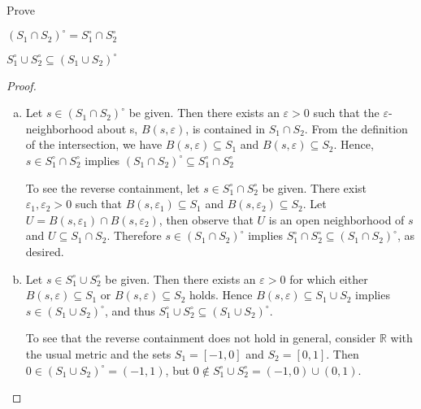 \documentclass[10pt]{amsart}
\begin{document}
\begin{ex13}{}
  Prove\\
  \begin{inparaenum}[(a)]
  \item\label{13a}
    $(S_1 \cap S_2)^\circ = S_1^\circ \cap S_2^\circ$\hspace{10mm}
  \item\label{13b}
    $S_1^\circ \cup S_2^\circ \subseteq (S_1 \cup S_2)^\circ$
  \end{inparaenum}
  
  \begin{proof}
    \begin{enumerate}[(a)]
    \item
      Let $s \in (S_1 \cap S_2)^\circ$ be given.
      Then there exists an $\varepsilon > 0$ such that the $\varepsilon$-neighborhood about s, $B(s,\varepsilon)$, is contained in $S_1 \cap S_2$.
      From the definition of the intersection, we have $B(s,\varepsilon) \subseteq S_1$ and $B(s,\varepsilon) \subseteq S_2$.
      Hence, $s \in S_1^\circ \cap S_2^\circ$ implies $(S_1 \cap S_2)^\circ \subseteq S_1^\circ \cap S_2^\circ$
      
      To see the reverse containment, let $s \in S_1^\circ \cap S_2^\circ$ be given.
      There exist $\varepsilon_1, \varepsilon_2 > 0$ such that $B(s,\varepsilon_1) \subseteq S_1$ and $B(s,\varepsilon_2) \subseteq S_2$.
      Let $U = B(s,\varepsilon_1) \cap B(s,\varepsilon_2)$, then observe that $U$ is an open neighborhood of $s$ and $U \subseteq S_1 \cap S_2$.
      Therefore $s \in (S_1 \cap S_2)^\circ$ implies $S_1^\circ \cap S_2^\circ \subseteq (S_1 \cap S_2)^\circ$, as desired.
    \item
      Let $s \in S_1^\circ \cup S_2^\circ$ be given.
      Then there exists an $\varepsilon > 0$ for which either $B(s,\varepsilon) \subseteq S_1$ or $B(s,\varepsilon) \subseteq S_2$ holds.
      Hence $B(s,\varepsilon) \subseteq S_1 \cup S_2$ implies $s \in (S_1 \cup S_2)^\circ$, and thus $S_1^\circ \cup S_2^\circ \subseteq (S_1 \cup S_2)^\circ$.
      
      To see that the reverse containment does not hold in general, consider $\mathbb{R}$ with the usual metric and the sets $S_1 = [-1,0]$ and $S_2 = [0,1]$.  
      Then $0 \in (S_1 \cup S_2)^\circ = (-1,1)$, but $0 \not \in S_1^\circ \cup S_2^\circ = (-1,0) \cup (0,1)$.
    \end{enumerate}
  \end{proof}
\end{ex13}{}
\end{document}
